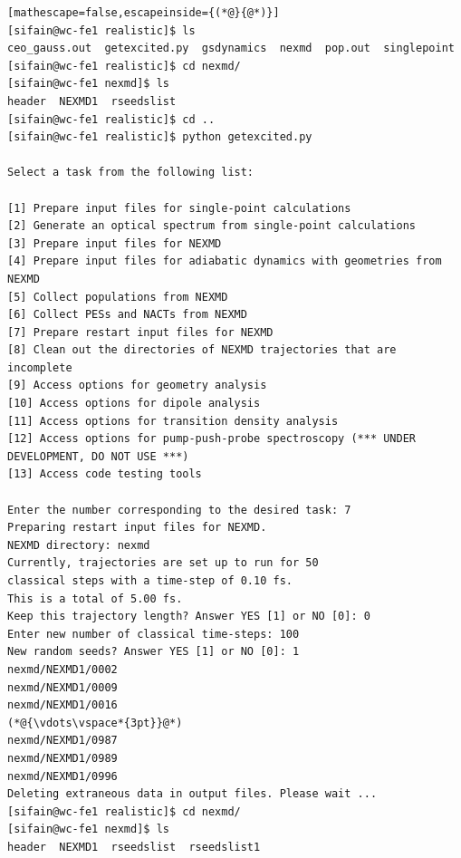 \documentclass[letterpaper,12pt,titlepage]{article}
\begin{document}
\begin{lstlisting}[mathescape=false,escapeinside={(*@}{@*)}]
[sifain@wc-fe1 realistic]$ ls
ceo_gauss.out  getexcited.py  gsdynamics  nexmd  pop.out  singlepoint
[sifain@wc-fe1 realistic]$ cd nexmd/
[sifain@wc-fe1 nexmd]$ ls
header  NEXMD1  rseedslist
[sifain@wc-fe1 realistic]$ cd ..
[sifain@wc-fe1 realistic]$ python getexcited.py 

Select a task from the following list:

[1] Prepare input files for single-point calculations
[2] Generate an optical spectrum from single-point calculations
[3] Prepare input files for NEXMD
[4] Prepare input files for adiabatic dynamics with geometries from NEXMD
[5] Collect populations from NEXMD
[6] Collect PESs and NACTs from NEXMD
[7] Prepare restart input files for NEXMD
[8] Clean out the directories of NEXMD trajectories that are incomplete
[9] Access options for geometry analysis
[10] Access options for dipole analysis
[11] Access options for transition density analysis
[12] Access options for pump-push-probe spectroscopy (*** UNDER DEVELOPMENT, DO NOT USE ***)
[13] Access code testing tools

Enter the number corresponding to the desired task: 7
Preparing restart input files for NEXMD.
NEXMD directory: nexmd 
Currently, trajectories are set up to run for 50 
classical steps with a time-step of 0.10 fs.
This is a total of 5.00 fs.
Keep this trajectory length? Answer YES [1] or NO [0]: 0
Enter new number of classical time-steps: 100
New random seeds? Answer YES [1] or NO [0]: 1
nexmd/NEXMD1/0002
nexmd/NEXMD1/0009
nexmd/NEXMD1/0016
(*@{\vdots\vspace*{3pt}}@*)
nexmd/NEXMD1/0987
nexmd/NEXMD1/0989
nexmd/NEXMD1/0996
Deleting extraneous data in output files. Please wait ...
[sifain@wc-fe1 realistic]$ cd nexmd/
[sifain@wc-fe1 nexmd]$ ls
header  NEXMD1  rseedslist  rseedslist1
\end{lstlisting}
\end{document}
